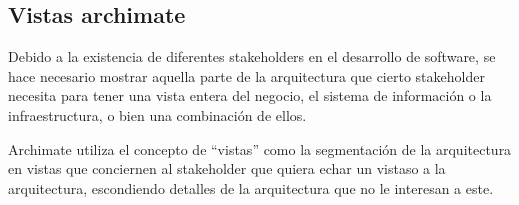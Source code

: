 \begin{itemize}
\begin{table}
\begin{center}
    \end{center}
\end{table}

\end{itemize}

\subsection{Vistas archimate}

Debido a la existencia de diferentes stakeholders en el desarrollo de software, se hace necesario mostrar aquella parte de la arquitectura que cierto stakeholder necesita para tener una vista entera del negocio, el sistema de información o la infraestructura, o bien una combinación de ellos.

Archimate utiliza el concepto de “vistas” como la segmentación de la arquitectura en vistas que conciernen al stakeholder que quiera echar un vistaso a la arquitectura, escondiendo detalles de la arquitectura que no le interesan a este.

